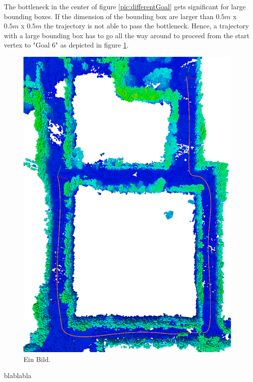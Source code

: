 The bottleneck in the center of figure \ref{pic:differentGoal} gets significant for large bounding boxes. If the dimension of the bounding box are larger than $0.5m$ x $0.5m$ x $0.5m$ the trajectory is not able to pass the bottleneck. Hence, a trajectory with a large bounding box has to go all the way around to proceed from the start vertex to "Goal 6" as depicted in figure \ref{pic:Goal6}.


\begin{figure}[ht]
   \centering
   \includegraphics[angle=90, width=1\textwidth]{pics/MapNlopt.png}
   \caption{Ein Bild.}
   \label{pic:Goal6}
\end{figure}

blablabla


%

